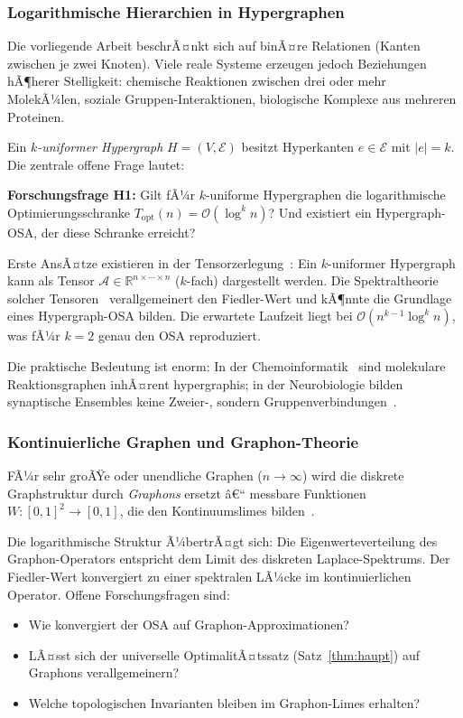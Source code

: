 ﻿\documentclass[12pt,a4paper,twoside]{article}
\theoremstyle{definition}
\theoremstyle{plain}
\theoremstyle{remark}
\begin{document}
\subsubsection{Logarithmische Hierarchien in Hypergraphen}

Die vorliegende Arbeit beschrÃ¤nkt sich auf binÃ¤re Relationen
(Kanten zwischen je zwei Knoten).  Viele reale Systeme erzeugen
jedoch Beziehungen hÃ¶herer Stelligkeit: chemische Reaktionen
zwischen drei oder mehr MolekÃ¼len, soziale Gruppen-Interaktionen,
biologische Komplexe aus mehreren Proteinen.

Ein \emph{$k$-uniformer Hypergraph} $H = (V, \mathcal{E})$ besitzt
Hyperkanten $e \in \mathcal{E}$ mit $|e| = k$.  Die zentrale
offene Frage lautet:

\textbf{Forschungsfrage H1:} Gilt fÃ¼r $k$-uniforme Hypergraphen
die logarithmische Optimierungsschranke
$T_{\text{opt}}(n) = \mathcal{O}(\log^k n)$?
Und existiert ein Hypergraph-OSA, der diese Schranke erreicht?

Erste AnsÃ¤tze existieren in der Tensorzerlegung~\cite{Kolda2009}:
Ein $k$-uniformer Hypergraph kann als Tensor $\mathcal{A} \in
\mathbb{R}^{n \times \cdots \times n}$ ($k$-fach) dargestellt werden.
Die Spektraltheorie solcher Tensoren~\cite{Qi2005} verallgemeinert
den Fiedler-Wert und kÃ¶nnte die Grundlage eines Hypergraph-OSA
bilden.  Die erwartete Laufzeit liegt bei
$\mathcal{O}(n^{k-1} \log^k n)$, was fÃ¼r $k=2$ genau den OSA
reproduziert.

Die praktische Bedeutung ist enorm: In der Chemoinformatik~\cite{Bertz1981}
sind molekulare Reaktionsgraphen inhÃ¤rent hypergraphis; in der
Neurobiologie bilden synaptische Ensembles keine Zweier-,
sondern Gruppenverbindungen~\cite{Reimann2017}.

\subsubsection{Kontinuierliche Graphen und Graphon-Theorie}

FÃ¼r sehr groÃŸe oder unendliche Graphen ($n \to \infty$)
wird die diskrete Graphstruktur durch \emph{Graphons} ersetzt â€“
messbare Funktionen $W: [0,1]^2 \to [0,1]$, die den
Kontinuumslimes bilden~\cite{Lovasz2012}.

Die logarithmische Struktur Ã¼bertrÃ¤gt sich: Die Eigenwerteverteilung
des Graphon-Operators entspricht dem Limit des diskreten
Laplace-Spektrums.  Der Fiedler-Wert konvergiert zu einer
spektralen LÃ¼cke im kontinuierlichen Operator.  Offene
Forschungsfragen sind:
\begin{itemize}
  \item Wie konvergiert der OSA auf Graphon-Approximationen?
  \item LÃ¤sst sich der universelle OptimalitÃ¤tssatz (Satz~\ref{thm:haupt})
        auf Graphons verallgemeinern?
  \item Welche topologischen Invarianten bleiben im
        Graphon-Limes erhalten?
\end{itemize}
\end{document}
